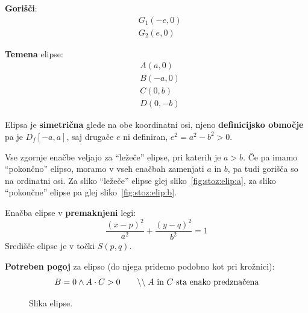 \documentclass[a4paper,oneside,12pt,fleqn]{article}
\newcommand\krat\cdot
\newcommand{\comment}[1]{\ensuremath{\qquad\backslash\backslash\;}\textnormal{#1}}
\newcommand{\beforecaptionskip}{\vspace{-12pt}}
\numberwithin{equation}{section}
\begin{document}
\textbf{Gorišči}:
\begin{align*}
 &G_1(-e, 0) \\
 &G_2(e, 0)
\end{align*}

\textbf{Temena} elipse:
\begin{align*}
  &A(a,0) \\
  &B(-a, 0) \\
  &C(0, b) \\
  &D(0,-b)
\end{align*}

Elipsa je \textbf{simetrična} glede na obe koordinatni osi, njeno \textbf{definicijsko območje} pa je
$D_f[-a, a]$, saj drugače $e$ ni definiran, $e^2 = a^2 - b^2 > 0$.

Vse zgornje enačbe veljajo za ``ležeče'' elipse, pri katerih je $a > b$. Če pa imamo
``pokončno'' elipso, moramo v vseh enačbah zamenjati $a$ in $b$, pa tudi gorišča so na
ordinatni osi. Za sliko ``ležeče'' elipse glej sliko~\ref{fig:stoz:elip:a}, za sliko
``pokončne'' elipse pa glej sliko~\ref{fig:stoz:elip:b}.

Enačba elipse v \textbf{premaknjeni} legi:
\[ \frac{(x-p)^2}{a^2} + \frac{(y-q)^2}{b^2} = 1 \]
Središče elipse je v točki $S(p,q)$.

\textbf{Potreben pogoj} za elipso (do njega pridemo podobno kot pri krožnici):
\[ B = 0 \land A \krat C > 0 \comment{$A$ in $C$ sta enako predznačena} \]

\begin{figure}[ht]
  \begin{center}
  \end{center}
  \beforecaptionskip
  \caption{Slika elipse.}
  \label{fig:stoz:elip}
\end{figure}
\end{document}

